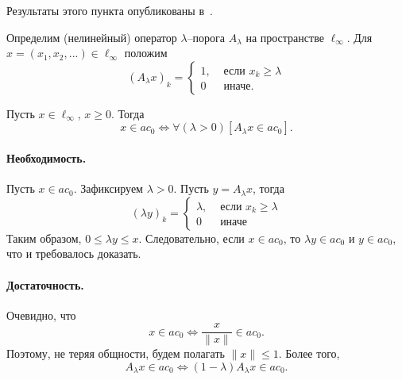 Результаты этого пункта опубликованы в~\cite{our-mz2019ac0}.

Определим (нелинейный) оператор $\lambda$--порога $A_\lambda$ на пространстве $\ell_\infty$.
Для $x = (x_1, x_2, ...) \in \ell_\infty$ положим
\begin{equation}
	(A_\lambda x)_k = \begin{cases}
		1, & \mbox{~если~} x_k \geq \lambda
		\\
		0  & \mbox{~иначе.~}
	\end{cases}
\end{equation}

\begin{theorem}
	Пусть $x\in\ell_\infty$, $x\geq 0$.
	Тогда
	\begin{equation}
		x\in ac_0 \Leftrightarrow
		\forall(\lambda>0)[A_\lambda x \in ac_0]
		.
	\end{equation}
\end{theorem}

\paragraph{Необходимость.}
Пусть $x\in ac_0$.
Зафиксируем $\lambda > 0$.
Пусть $y=A_\lambda x$, тогда
\begin{equation}
	(\lambda y)_k = \begin{cases}
		\lambda, & \mbox{~если~} x_k \geq \lambda
		\\
		0  & \mbox{~иначе~}
	\end{cases}
\end{equation}
Таким образом, $0 \leq \lambda y \leq x$.
Следовательно, если $x \in ac_0$,
то $\lambda y \in ac_0$ и $y \in ac_0$,
что и требовалось доказать.

\paragraph{Достаточность.}
Очевидно, что
\begin{equation}
	x\in ac_0 \Leftrightarrow
	\frac{x}{\|x\|}\in ac_0
	.
\end{equation}
Поэтому, не теряя общности, будем полагать $\|x\|\leq 1$.
Более того,
\begin{equation}
	A_\lambda x \in ac_0 \Leftrightarrow
	(1-\lambda)A_\lambda x \in ac_0
	.
\end{equation}

